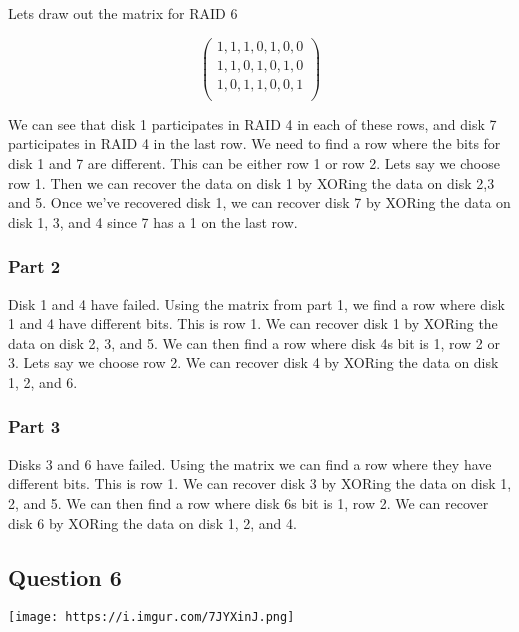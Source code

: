 \documentclass[
  letterpaper,
  DIV=11,
  numbers=noendperiod]{scrartcl}
\begin{document}
Lets draw out the matrix for RAID 6

\[
\begin{pmatrix}
1,1,1,0,1,0,0\\
1,1,0,1,0,1,0\\
1,0,1,1,0,0,1\\
\end{pmatrix}
\]

We can see that disk 1 participates in RAID 4 in each of these rows, and
disk 7 participates in RAID 4 in the last row. We need to find a row
where the bits for disk 1 and 7 are different. This can be either row 1
or row 2. Lets say we choose row 1. Then we can recover the data on disk
1 by XORing the data on disk 2,3 and 5. Once we've recovered disk 1, we
can recover disk 7 by XORing the data on disk 1, 3, and 4 since 7 has a
1 on the last row.

\hypertarget{part-2-1}{%
\subsubsection{Part 2}\label{part-2-1}}

Disk 1 and 4 have failed. Using the matrix from part 1, we find a row
where disk 1 and 4 have different bits. This is row 1. We can recover
disk 1 by XORing the data on disk 2, 3, and 5. We can then find a row
where disk 4s bit is 1, row 2 or 3. Lets say we choose row 2. We can
recover disk 4 by XORing the data on disk 1, 2, and 6.

\hypertarget{part-3-1}{%
\subsubsection{Part 3}\label{part-3-1}}

Disks 3 and 6 have failed. Using the matrix we can find a row where they
have different bits. This is row 1. We can recover disk 3 by XORing the
data on disk 1, 2, and 5. We can then find a row where disk 6s bit is 1,
row 2. We can recover disk 6 by XORing the data on disk 1, 2, and 4.

\hypertarget{question-6}{%
\subsection{Question 6}\label{question-6}}

\texttt{[image: https://i.imgur.com/7JYXinJ.png]}
\end{document}
